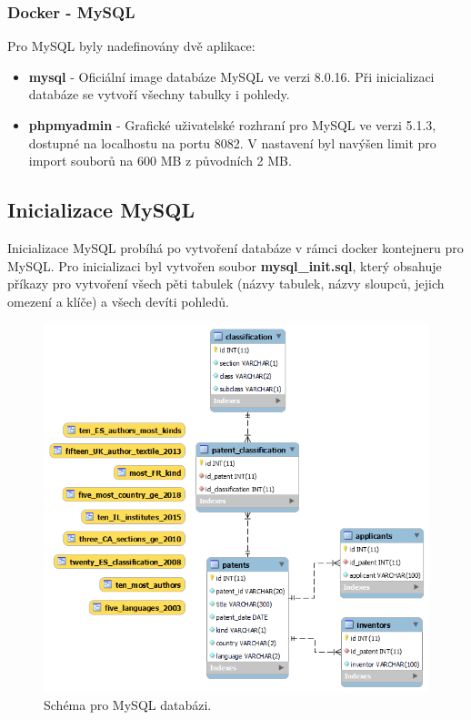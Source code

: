 \subsubsection{Docker - MySQL}
Pro MySQL byly nadefinovány dvě aplikace:
\begin{itemize}
\item \textbf{mysql} - Oficiální image databáze MySQL ve verzi 8.0.16. Při inicializaci databáze se vytvoří všechny tabulky i pohledy.
\item \textbf{phpmyadmin} - Grafické uživatelské rozhraní pro MySQL ve verzi 5.1.3, dostupné na localhostu na portu 8082. V nastavení byl navýšen limit pro import souborů na 600 MB z původních 2 MB.
\end{itemize}

\subsection{Inicializace MySQL}
Inicializace MySQL probíhá po vytvoření databáze v rámci docker kontejneru pro MySQL. Pro inicializaci byl vytvořen soubor \textbf{mysql\_init.sql}, který obsahuje příkazy pro vytvoření všech pěti tabulek (názvy tabulek, názvy sloupců, jejich omezení a klíče) a všech devíti pohledů.
\begin{figure}[H]
\centering
\includegraphics[width=12cm]{img/eer}
\caption{Schéma pro MySQL databázi.}
\label{fig:mysql_schema}
\end{figure}

